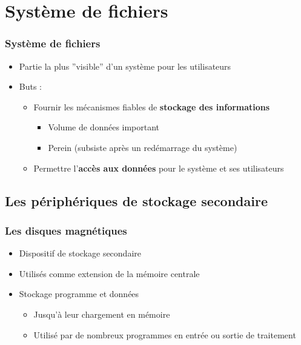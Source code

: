 




\section{Système de fichiers}

\begin{frame}
\frametitle{Système de fichiers}
\begin{itemize}
\item Partie la plus ''visible'' d'un système pour les utilisateurs
\item Buts :
\begin{itemize}
\item Fournir les mécanismes fiables de \textbf{stockage des informations}
\begin{itemize}
\item Volume de données important
\item Perein (subsiste après un redémarrage du système)
\end{itemize}
\item Permettre l'\textbf{accès aux données} pour le système et ses utilisateurs
\end{itemize}
\end{itemize}
\end{frame}

\subsection{Les périphériques de stockage secondaire}

\begin{frame}
\frametitle{Les disques magnétiques}
\begin{itemize}
\item Dispositif de stockage secondaire
\item Utilisés comme extension de la mémoire centrale
\item Stockage programme et données
\begin{itemize}
\item Jusqu’à leur chargement en mémoire
\item Utilisé par de nombreux programmes en entrée ou sortie de traitement
\end{itemize}
\end{itemize}
\end{frame}

